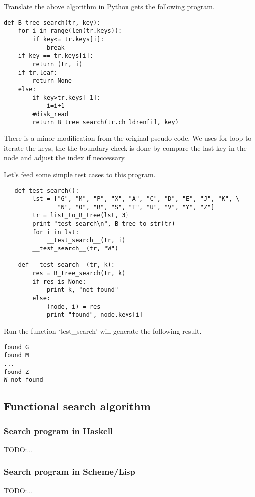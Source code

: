 \documentclass{article}
\begin{document}
Translate the above algorithm in Python gets the following program.

\lstset{language=Python}
\begin{lstlisting}
def B_tree_search(tr, key):
    for i in range(len(tr.keys)):
        if key<= tr.keys[i]:
            break
    if key == tr.keys[i]:
        return (tr, i)
    if tr.leaf:
        return None
    else:
        if key>tr.keys[-1]:
            i=i+1
        #disk_read
        return B_tree_search(tr.children[i], key)
\end{lstlisting}

There is a minor modification from the original pseudo code.
We uses for-loop to iterate the keys, the the boundary check is done
by compare the last key in the node and adjust the index if
neccessary.

Let's feed some simple test cases to this program.

\begin{lstlisting}
   def test_search():
        lst = ["G", "M", "P", "X", "A", "C", "D", "E", "J", "K", \
               "N", "O", "R", "S", "T", "U", "V", "Y", "Z"]
        tr = list_to_B_tree(lst, 3)
        print "test search\n", B_tree_to_str(tr)
        for i in lst:
            __test_search__(tr, i)
        __test_search__(tr, "W")

    def __test_search__(tr, k):
        res = B_tree_search(tr, k)
        if res is None:
            print k, "not found"
        else:
            (node, i) = res
            print "found", node.keys[i]
\end{lstlisting}

Run the function `test\_search' will generate the following result.

\begin{verbatim}
found G
found M
...
found Z
W not found
\end{verbatim}

\subsection{Functional search algorithm}

\subsubsection*{Search program in Haskell}
TODO:...

\subsubsection*{Search program in Scheme/Lisp}
TODO:...
\end{document}
